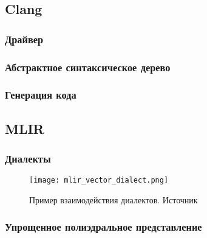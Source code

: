 \subsection{Clang}
\subsubsection{Драйвер}
\subsubsection{Абстрактное синтаксическое дерево}
\subsubsection{Генерация кода}

\subsection{MLIR}
\subsubsection{Диалекты}
\begin{figure}[h]
    \centering
    \texttt{[image: mlir\_vector\_dialect.png]}
    \caption{Пример взаимодействия диалектов. Источник 
    }
    \label{fig:mlir_vector_dialect}
\end{figure}
\subsubsection{Упрощенное полиэдральное представление}
